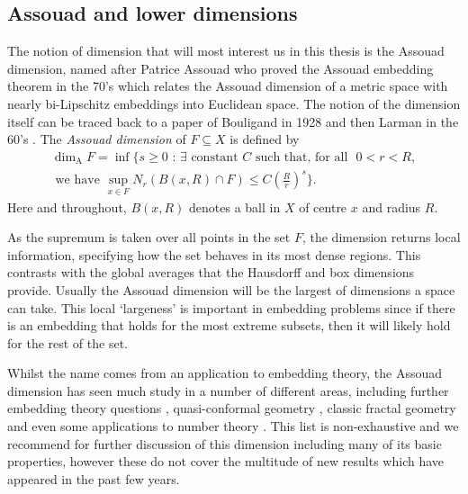 \subsection{Assouad and lower dimensions}
\label{sec:intro-ass}

The notion of dimension that will most interest us in this thesis is the Assouad dimension, named after Patrice Assouad who proved the Assouad embedding theorem in the 70's \cite{assouad1, assouad2} which relates the Assouad dimension of a metric space with nearly bi-Lipschitz embeddings into Euclidean space. The notion of the dimension itself can be traced back to a paper of Bouligand in 1928 \cite{bouligand} and then Larman in the 60's \cite{larman1,larman2}. The \textit{Assouad dimension} of $F \subseteq X$ is defined by 
\begin{multline*}
\dim_{\text{A}} F = \inf \Bigg\{ s \geq 0 \, \,  : \, \exists \text{ constant } C \text{ such that, for all } \, \, 0< r< R,\\ \text{ we have  }\sup_{x\in F} N_r (B(x,R)\cap F) \leq C\left(\frac{R}{r}\right)^{s} \Bigg\}.
\end{multline*}
Here and throughout, $B(x,R)$ denotes a ball in $X$ of centre $x$ and radius $R$.

As the supremum is taken over all points in the set $F$, the dimension returns local information, specifying how the set behaves in its most dense regions. This contrasts with the global averages that the Hausdorff and box dimensions provide. Usually the Assouad dimension will be the largest of dimensions a space can take. This local `largeness' is important in embedding problems since if there is an embedding that holds for the most extreme subsets, then it will likely hold for the rest of the set. 

Whilst the name comes from an application to embedding theory, the Assouad dimension has seen much study in a number of different areas, including further embedding theory questions \cite{olson02, olson10, robinson}, quasi-conformal geometry \cite{heinonen, tyson, mackaytyson}, classic fractal geometry \cite{fraser-kaenmaki-proj, fraser-todd, tros, orponen, ldr} and even some applications to number theory \cite{FY, fraser-saito-yu}. This list is non-exhaustive and we recommend \cite{robinson, Fr} for further discussion of this dimension including many of its basic properties, however these do not cover the multitude of new results which have appeared in the past few years. 

